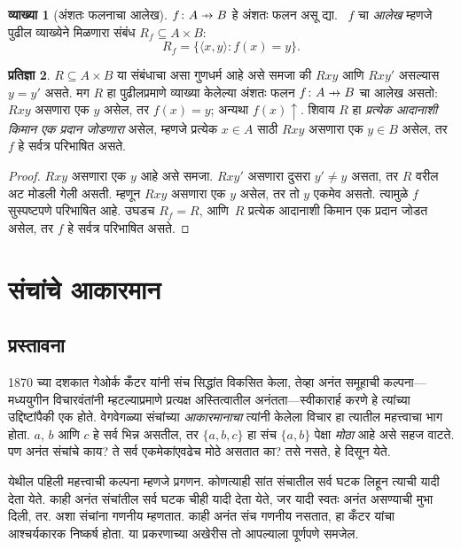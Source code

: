 \documentclass[11pt,a4paper,openany]{book}
\theoremstyle{definition}
\newtheorem{defn}{व्याख्या}[section]
\newtheorem{prop}[defn]{प्रतिज्ञा}
\newcommand{\Setabs}[2]{\{#1:#2\}}
\newcommand{\tuple}[1]{\langle #1\rangle}
\newcommand{\pto}{\mathrel{\ooalign{\hfil$\mapstochar\mkern 5mu$\hfil\cr$\to$}}}
\newcommand{\fundefined}{\uparrow}
\begin{document}
\begin{defn}[अंशतः फलनाचा आलेख]
$f\colon A \pto B$ हे अंशतः फलन असू द्या. ~$f$ चा \emph{आलेख}
म्हणजे पुढील व्याख्येने मिळणारा संबंध $R_f \subseteq A \times B$:
\[
R_f = \Setabs{\tuple{x,y}}{f(x) = y}.
\]
\end{defn}

\begin{prop}
$R \subseteq A \times B$ या संबंधाचा असा गुणधर्म आहे असे समजा की
$Rxy$ आणि $Rxy'$ असल्यास $y = y'$ असते. मग $R$ हा पुढीलप्रमाणे
व्याख्या केलेल्या अंशतः फलन $f\colon A \pto B$ चा आलेख असतो:
$Rxy$ असणारा एक $y$ असेल, तर $f(x) = y$; अन्यथा $f(x) \fundefined$.
शिवाय $R$ हा \emph{प्रत्येक आदानाशी किमान एक प्रदान जोडणारा} असेल,
म्हणजे प्रत्येक $x \in A$ साठी $Rxy$ असणारा एक $y \in B$ असेल,
तर $f$ हे सर्वत्र परिभाषित असते.
\end{prop}

\begin{proof}
$Rxy$ असणारा एक $y$ आहे असे समजा. $Rxy'$ असणारा दुसरा
$y' \neq y$ असता, तर $R$ वरील अट मोडली गेली असती. म्हणून
$Rxy$ असणारा एक $y$ असेल, तर तो $y$ एकमेव असतो. त्यामुळे $f$
सुस्पष्टपणे परिभाषित आहे. उघडच $R_f = R$, आणि~$R$ प्रत्येक आदानाशी
किमान एक प्रदान जोडत असेल, तर $f$ हे सर्वत्र परिभाषित असते.
\end{proof}



\chapter{संचांचे आकारमान}\label{sfr:siz::chap}






\section{प्रस्तावना}\label{sfr:siz:int:sec}

1870 च्या दशकात गेओर्क कँटर यांनी संच सिद्धांत
विकसित केला, तेव्हा अनंत समूहाची कल्पना---मध्ययुगीन विचारवंतांनी
म्हटल्याप्रमाणे प्रत्यक्ष अस्तित्वातील अनंतता---स्वीकारार्ह करणे हे
त्यांच्या उद्दिष्टांपैकी एक होते. वेगवेगळ्या संचांच्या \emph{आकारमानाचा}
त्यांनी केलेला विचार हा त्यातील महत्त्वाचा भाग होता. $a$, $b$ आणि $c$
हे सर्व भिन्न असतील, तर $\{a, b, c\}$ हा संच $\{a, b\}$ पेक्षा
\emph{मोठा} आहे असे सहज वाटते. पण अनंत संचांचे काय? ते सर्व
एकमेकांएवढेच मोठे असतात का? तसे नसते, हे दिसून येते.

येथील पहिली महत्त्वाची कल्पना म्हणजे प्रगणन. कोणत्याही सांत संचातील
सर्व घटक लिहून त्याची यादी देता येते. काही अनंत संचांतील
सर्व घटक चीही यादी देता येते, जर यादी स्वतः अनंत असण्याची
मुभा दिली, तर. अशा संचांना गणनीय म्हणतात. काही अनंत संच
गणनीय नसतात, हा कँटर यांचा आश्चर्यकारक निष्कर्ष होता.
या प्रकरणाच्या अखेरीस तो आपल्याला पूर्णपणे समजेल.
\end{document}
